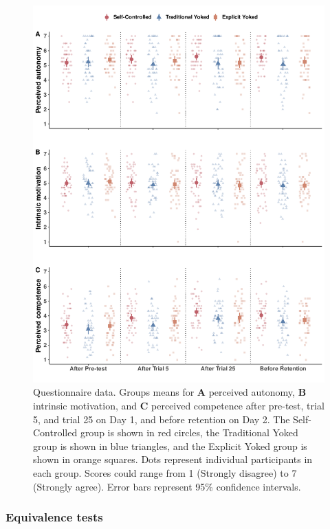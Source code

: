 \documentclass[
  english,
  man,floatsintext]{apa7}
\begin{document}
\begin{figure}

{\centering \includegraphics[height=0.72\textheight]{../../figs/fig2} 

}

\caption{Questionnaire data. Groups means for \textbf{A} perceived autonomy, \textbf{B} intrinsic motivation, and \textbf{C} perceived competence after pre-test, trial 5, and trial 25 on Day 1, and before retention on Day 2. The Self-Controlled group is shown in red circles, the Traditional Yoked group is shown in blue triangles, and the Explicit Yoked group is shown in orange squares. Dots represent individual participants in each group. Scores could range from 1 (Strongly disagree) to 7 (Strongly agree). Error bars represent 95\% confidence intervals.}\label{fig:fig2}
\end{figure}

\hypertarget{equivalence-tests}{%
\subsubsection{Equivalence tests}\label{equivalence-tests}}
\end{document}
